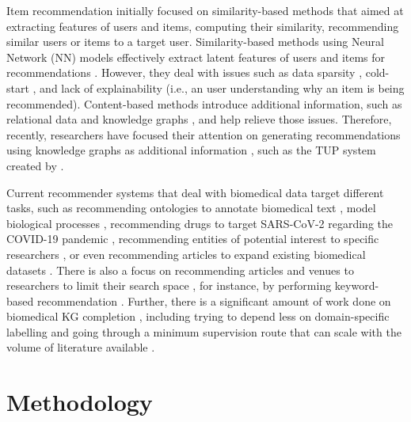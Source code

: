 Item recommendation initially focused on similarity-based methods that aimed at extracting features of users and items, computing their similarity, recommending similar users or items to a target user. Similarity-based methods using Neural Network (NN) models effectively extract latent features of users and items for recommendations \citep{10.1145/2959100.2959190,10.1145/3109859.3109872,huang2020efficient}. However, they deal with issues such as data sparsity \citep{guo2017resolving}, cold-start \citep{10.1145/3397271.3401426}, and lack of explainability \citep{10.1145/3397271.3401032} (i.e., an user understanding why an item is being recommended). Content-based methods introduce additional information, such as relational data \citep{10.1145/3309547} and knowledge graphs \citep{ai2018learning,10.1145/3308558.3313411}, and help relieve those issues. Therefore, recently, researchers have focused their attention on generating recommendations using knowledge graphs as additional information \citep{9216015,10.1145/3397271.3401428}, such as the TUP system created by \cite{10.1145/3308558.3313705}.

Current recommender systems that deal with biomedical data target different tasks, such as recommending ontologies to annotate biomedical text \citep{martinez2017ncbo}, model biological processes \citep{wang2020independent}, recommending drugs to target SARS-CoV-2 regarding the COVID-19 pandemic \citep{info:doi/10.2196/21169}, recommending entities of potential interest to specific researchers \citep{barros2019using}, or even recommending articles to expand existing biomedical datasets \citep{PATRA2020103399}. There is also a focus on recommending articles and venues to researchers to limit their search space \citep{PMID:30441232, info:doi/10.2196/12957}, for instance, by performing keyword-based recommendation \citep{yang2018keyword}. Further, there is a significant amount of work done on biomedical KG completion \citep{zhang2021drug,fei2020enriching,biswas2019relation}, including trying to depend less on domain-specific labelling and going through a minimum supervision route that can scale with the volume of literature available \citep{yuan2020constructing}. 


\section{Methodology}

